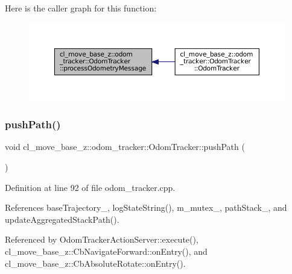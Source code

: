 Here is the caller graph for this function\+:
\nopagebreak
\begin{figure}[H]
\begin{center}
\leavevmode
\includegraphics[width=350pt]{classcl__move__base__z_1_1odom__tracker_1_1OdomTracker_a12c5a839cfde2e8f2f55a5e0c9647b18_icgraph}
\end{center}
\end{figure}
\mbox{\label{classcl__move__base__z_1_1odom__tracker_1_1OdomTracker_a205ee48ec8b4599658e7408fc4755239}} 
\subsubsection{\texorpdfstring{push\+Path()}{pushPath()}}
{\footnotesize\ttfamily void cl\+\_\+move\+\_\+base\+\_\+z\+::odom\+\_\+tracker\+::\+Odom\+Tracker\+::push\+Path (\begin{DoxyParamCaption}{ }\end{DoxyParamCaption})}



Definition at line 92 of file odom\+\_\+tracker.\+cpp.



References base\+Trajectory\+\_\+, log\+State\+String(), m\+\_\+mutex\+\_\+, path\+Stack\+\_\+, and update\+Aggregated\+Stack\+Path().



Referenced by Odom\+Tracker\+Action\+Server\+::execute(), cl\+\_\+move\+\_\+base\+\_\+z\+::\+Cb\+Navigate\+Forward\+::on\+Entry(), and cl\+\_\+move\+\_\+base\+\_\+z\+::\+Cb\+Absolute\+Rotate\+::on\+Entry().


